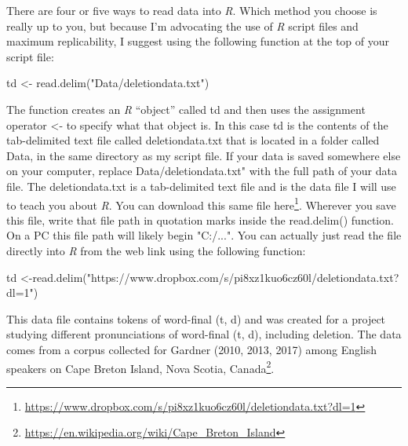 \documentclass[
  10pt,
  letterpaper]{article}
\newenvironment{Shaded}{\begin{snugshade}}{\end{snugshade}}
\newcommand{\FunctionTok}[1]{\textcolor[rgb]{0.28,0.35,0.67}{#1}}
\newcommand{\NormalTok}[1]{\textcolor[rgb]{0.00,0.23,0.31}{#1}}
\newcommand{\OtherTok}[1]{\textcolor[rgb]{0.00,0.23,0.31}{#1}}
\newcommand{\StringTok}[1]{\textcolor[rgb]{0.13,0.47,0.30}{#1}}
\renewcommand\texttt[1]{{\ttfamily\color{BrickRed}#1}}
\DeclareRobustCommand{\href}[2]{#2\footnote{\url{#1}}}
\begin{document}
There are four or five ways to read data into \emph{R}. Which method you
choose is really up to you, but because I'm advocating the use of
\emph{R} script files and maximum replicability, I suggest using the
following function at the top of your script file:

\begin{Shaded}
\begin{Highlighting}[]
\NormalTok{td }\OtherTok{\textless{}{-}} \FunctionTok{read.delim}\NormalTok{(}\StringTok{"Data/deletiondata.txt"}\NormalTok{)}
\end{Highlighting}
\end{Shaded}

The function creates an \emph{R} ``object'' called \texttt{td} and then
uses the assignment operator \texttt{\textless{}-} to specify what that
object is. In this case \texttt{td} is the contents of the tab-delimited
text file called \texttt{deletiondata.txt} that is located in a folder
called \texttt{Data}, in the same directory as my script file. If your
data is saved somewhere else on your computer, replace
\texttt{\textquotesingle{}Data/deletiondata.txt"} with the full path of
your data file. The \texttt{deletiondata.txt} is a tab-delimited text
file and is the data file I will use to teach you about \emph{R}. You
can download this same file
\href{https://www.dropbox.com/s/pi8xz1kuo6cz60l/deletiondata.txt?dl=1}{here}.
Wherever you save this file, write that file path in quotation marks
inside the \texttt{read.delim()} function. On a PC this file path will
likely begin \texttt{"C:/..."}. You can actually just read the file
directly into \emph{R} from the web link using the following function:

\begin{Shaded}
\begin{Highlighting}[]
\NormalTok{td }\OtherTok{\textless{}{-}}\FunctionTok{read.delim}\NormalTok{(}\StringTok{"https://www.dropbox.com/s/pi8xz1kuo6cz60l/deletiondata.txt?dl=1"}\NormalTok{)}
\end{Highlighting}
\end{Shaded}

This data file contains tokens of word-final (t, d) and was created for
a project studying different pronunciations of word-final (t, d),
including deletion. The data comes from a corpus collected for Gardner
(2010, 2013, 2017) among English speakers on
\href{https://en.wikipedia.org/wiki/Cape_Breton_Island}{Cape Breton
Island, Nova Scotia, Canada}.
\end{document}
